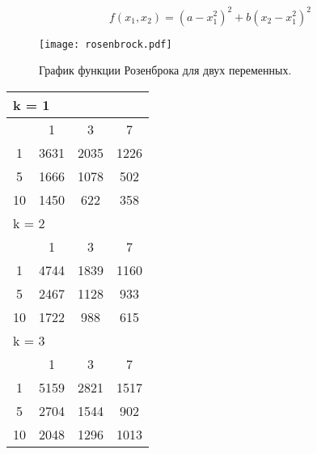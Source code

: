 \begin{equation}
\label{rosenbrock_eq}
f(x_1, x_2) = (a - x_1^2)^2 + b(x_2 - x_1^2)^2
\end{equation}


\begin{figure}
    \centering
    \texttt{[image: rosenbrock.pdf]}
    \caption{График функции Розенброка для двух переменных.}
    \label{rosenbrock_plot}
\end{figure}

\begin{table}
\begin{tabular}{|*4{c|}}
\hline
\multicolumn{4}{|l|}{k = 1} \\
\hline
\diagbox{$\mu$}{$\lambda$} & \multicolumn{1}{c|}{1} & \multicolumn{1}{c|}{3} & \multicolumn{1}{c|}{7} \\
\hline
1 & 3631 & 2035 & 1226 \\
\hline
5 & 1666 & 1078 & 502 \\
\hline
10 & 1450 & 622 & 358 \\
\hline
\multicolumn{4}{|l|}{k = 2} \\
\hline
\diagbox{$\mu$}{$\lambda$} & \multicolumn{1}{c|}{1} & \multicolumn{1}{c|}{3} & \multicolumn{1}{c|}{7} \\
\hline
1 & 4744 & 1839 & 1160 \\
\hline
5 & 2467 & 1128 & 933 \\
\hline
10 & 1722 & 988 & 615 \\
\hline
\multicolumn{4}{|l|}{k = 3} \\
\hline
\diagbox{$\mu$}{$\lambda$} & \multicolumn{1}{c|}{1} & \multicolumn{1}{c|}{3} & \multicolumn{1}{c|}{7} \\
\hline
1 & 5159 & 2821 & 1517 \\
\hline
5 & 2704 & 1544 & 902 \\
\hline
10 & 2048 & 1296 & 1013 \\
\hline
\end{tabular}
\end{table}

